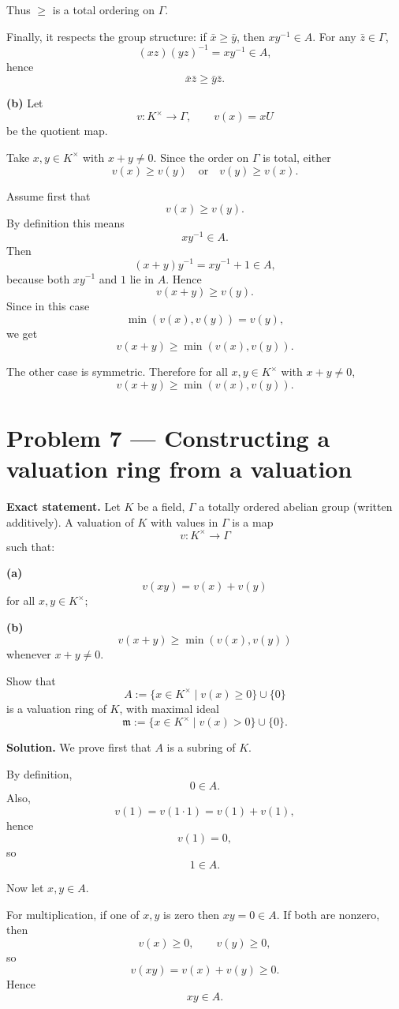 \documentclass[12pt,a4paper,oneside]{report}
\theoremstyle{notespace}
\begin{document}
Thus \(\ge\) is a total ordering on \(\Gamma\).

Finally, it respects the group structure: if \(\bar x\ge \bar y\), then \(xy^{-1}\in A\). For any \(\bar z\in \Gamma\),
\[
(xz)(yz)^{-1}=xy^{-1}\in A,
\]
hence
\[
\bar x\bar z\ge \bar y\bar z.
\]

\medskip

\textbf{(b)} Let
\[
v:K^\times\to \Gamma,\qquad v(x)=xU
\]
be the quotient map.

Take \(x,y\in K^\times\) with \(x+y\neq 0\). Since the order on \(\Gamma\) is total, either
\[
v(x)\ge v(y)
\quad\text{or}\quad
v(y)\ge v(x).
\]

Assume first that
\[
v(x)\ge v(y).
\]
By definition this means
\[
xy^{-1}\in A.
\]
Then
\[
(x+y)y^{-1}=xy^{-1}+1\in A,
\]
because both \(xy^{-1}\) and \(1\) lie in \(A\). Hence
\[
v(x+y)\ge v(y).
\]
Since in this case
\[
\min(v(x),v(y))=v(y),
\]
we get
\[
v(x+y)\ge \min(v(x),v(y)).
\]

The other case is symmetric. Therefore for all \(x,y\in K^\times\) with \(x+y\neq 0\),
\[
v(x+y)\ge \min(v(x),v(y)).
\]

\bigskip

\section{Problem 7 --- Constructing a valuation ring from a valuation}

\textbf{Exact statement.}
Let \(K\) be a field, \(\Gamma\) a totally ordered abelian group (written additively). A valuation of \(K\) with values in \(\Gamma\) is a map
\[
v:K^\times\to \Gamma
\]
such that:

\textbf{(a)}
\[
v(xy)=v(x)+v(y)
\]
for all \(x,y\in K^\times\);

\textbf{(b)}
\[
v(x+y)\ge \min(v(x),v(y))
\]
whenever \(x+y\neq 0\).

Show that
\[
A:=\{x\in K^\times\mid v(x)\ge 0\}\cup\{0\}
\]
is a valuation ring of \(K\), with maximal ideal
\[
\mathfrak m:=\{x\in K^\times\mid v(x)>0\}\cup\{0\}.
\]

\textbf{Solution.}
We prove first that \(A\) is a subring of \(K\).

By definition,
\[
0\in A.
\]
Also,
\[
v(1)=v(1\cdot 1)=v(1)+v(1),
\]
hence
\[
v(1)=0,
\]
so
\[
1\in A.
\]

Now let \(x,y\in A\).

For multiplication, if one of \(x,y\) is zero then \(xy=0\in A\). If both are nonzero, then
\[
v(x)\ge 0,\qquad v(y)\ge 0,
\]
so
\[
v(xy)=v(x)+v(y)\ge 0.
\]
Hence
\[
xy\in A.
\]
\end{document}
